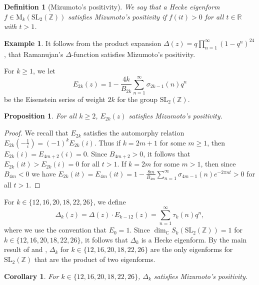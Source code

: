 \documentclass[12pt,reqno]{amsart}
\newtheorem{corollary}[theorem]{Corollary}
\newtheorem{proposition}[theorem]{Proposition}
\newtheorem{definition}[theorem]{Definition}
\theoremstyle{definition}
\newtheorem{example}[theorem]{Example}
\numberwithin{equation}{section}
\newcommand{\SL}{\mathrm{SL}}
\begin{document}
\begin{definition}[Mizumoto's positivity]
We say that a Hecke eigenform $f \in \textrm{M}_k(\SL_2(\mathbb Z))$ satisfies Mizumoto's positivity if $f(it) >0$ for all $t \in \mathbb R$ with $t>1$. 
\end{definition}

\begin{example} \label{miz2}
It follows from the product expansion
$\displaystyle{
\Delta(z)=q\prod_{n=1}^{\infty} (1-q^n)^{24}}$, that Ramanujan's $\Delta$-function satisfies Mizumoto's positivity. 
\end{example}

For $k \geq 1$, we let $$E_{2k}(z)= 1-\frac{4k}{B_{2k}} \sum_{n=1}^{\infty} \sigma_{2k-1}(n) q^n$$ be the Eisenstein series of weight $2k$ for the group $\SL_2(\mathbb Z)$. 

\begin{proposition} \label{miz1}
For all $k \geq 2$, $E_{2k}(z)$ satisfies Mizumoto's positivity. 
\end{proposition}

\begin{proof}
We recall that $E_{2k}$ satisfies the automorphy relation
$
E_{2k} \left(-\frac{1}{i} \right ) = (-1)^{k} E_{2k}(i). 
$
Thus if $k=2m+1$ for some $m \geq 1$, then $E_{2k}(i)=E_{4m+2}(i)=0$. Since $B_{4m+2}>0$, it follows that  
$
E_{2k}(it)>E_{2k}(i)=0 
$
for all $t>1$. If $k=2m$ for some $m > 1$, then since $B_{4m}<0$ we have 
$
E_{2k}(it)=E_{4m}(it)= 1-\frac{8m}{B_{4m}} \sum_{n=1}^{\infty} \sigma_{4m-1}(n) e^{- 2 \pi  n t}>0 
$ 
for all $t >1$. 
\end{proof}


For  $k \in \{12, 16, 20, 18, 22, 26\}$, we define 
$$
\Delta_k(z)= \Delta(z) \cdot E_{k-12}(z)=\sum_{n=1}^{\infty} \tau_k(n) q^n, 
$$
where we use the convention that $E_0=1$. Since $\dim_{\mathbb C}S_k(\SL_2(\mathbb Z))=1$ for $k \in \{12, 16, 20, 18, 22, 26\}$, it follows that $\Delta_k$ is a Hecke eigenform. By the main result of \cite{Duke1999} and \cite{Gha00, Gha02}, $\Delta_k$ for $k \in \{12, 16, 20, 18, 22, 26\}$ are the only eigenforms for $\SL_2(\mathbb Z)$ that are the product of two eigenforms. 

\begin{corollary} \label{deltak}
For  $k \in \{12, 16, 20, 18, 22, 26\}$, $\Delta_k$ satisfies Mizumoto's positivity. 
\end{corollary}
\end{document}
